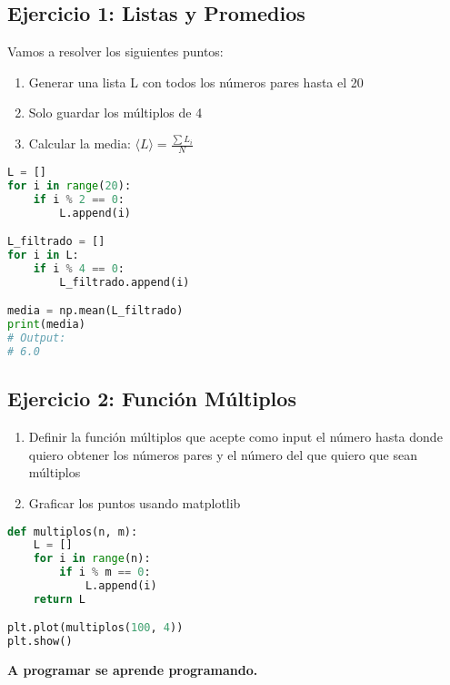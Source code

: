 \documentclass[12pt]{article}
\begin{document}
\subsection{Ejercicio 1: Listas y Promedios}
Vamos a resolver los siguientes puntos:
\begin{enumerate}
    \item Generar una lista L con todos los números pares hasta el 20
    \item Solo guardar los múltiplos de 4
    \item Calcular la media: $\langle L \rangle = \frac{\sum L_i}{N}$
\end{enumerate}

\begin{lstlisting}[language=Python]
L = []
for i in range(20):
    if i % 2 == 0:
        L.append(i)

L_filtrado = []
for i in L:
    if i % 4 == 0:
        L_filtrado.append(i)

media = np.mean(L_filtrado)
print(media)
# Output:
# 6.0
\end{lstlisting}

\subsection{Ejercicio 2: Función Múltiplos}
\begin{enumerate}
    \item Definir la función múltiplos que acepte como input el número hasta donde quiero obtener los números pares y el número del que quiero que sean múltiplos
    \item Graficar los puntos usando matplotlib
\end{enumerate}

\begin{lstlisting}[language=Python]
def multiplos(n, m):
    L = []
    for i in range(n):
        if i % m == 0:
            L.append(i)
    return L

plt.plot(multiplos(100, 4))
plt.show()
\end{lstlisting}

\begin{center}
\Huge\textbf{A programar se aprende programando.}
\end{center}
\end{document}
